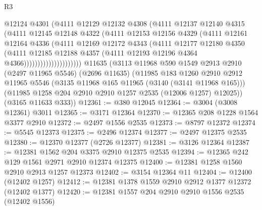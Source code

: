 \begin{lexlean}{R3}
\begin{coremodule}
                            @12124
                            @4301
                            (@4111
                              @12129
                              @12132
                              @4308
                              (@4111
                                @12137
                                @12140
                                @4315
                                (@4111
                                  @12145
                                  @12148
                                  @4322
                                  (@4111
                                    @12153
                                    @12156
                                    @4329
                                    (@4111
                                      @12161
                                      @12164
                                      @4336
                                      (@4111
                                        @12169
                                        @12172
                                        @4343
                                        (@4111
                                          @12177
                                          @12180
                                          @4350
                                          (@4111
                                            @12185
                                            @12188
                                            @4357
                                            (@4111 @12193 @12196 @4364 @4366)))))))))))))))))))))
    @11635
    (@3113
      @11968
      @590
      @1549
      @2913
      @2910
      (@2497 @11965 @5546)
      (@2696 @11635)
      (@11985
        @183
        @1260
        @2910
        @2912
        @11965
        @5546
        (@3135 @11968 @165 @11965 (@3140 (@3141 @11968 @165)))
        (@11985 @1258 @204 @2910 @2910 @1257 @2535 (@12006 @1257) @12025))
      (@3165 @11633 @333))
@12361 := @380 @12045
@12364 := @3004 (@3008 @12361) @3011
@12365 := @3171 @12364
@12370 := @12365 @208 @1228 @1564 @3377 @2910
@12372 := @2497 @1556 @2535
@12373 := @8797 @12372
@12374 := @5545 @12373
@12375 := @2496 @12374
@12377 := @2497 @12375 @2535
@12380 := @12370 @12377 (@2726 @12377)
@12381 := @3126 @12364
@12387 := @12381 @1562 @204 @3375 @2910 @12375 @2535
@12394 := @12365 @242 @129 @1561 @2971 @2910 @12374 @12375
@12400 := @12381 @1258 @1560 @2910 @2913 @1257 @12373
@12402 := @3154 @12364 @11
@12404 := @12400 (@12402 @1257)
@12412 := @12381 @1378 @1559 @2910 @2912 @1377 @12372 (@12402 @1377)
@12420 := @12381 @1557 @204 @2910 @2910 @1556 @2535 (@12402 @1556)

\end{coremodule}
\end{lexlean}
